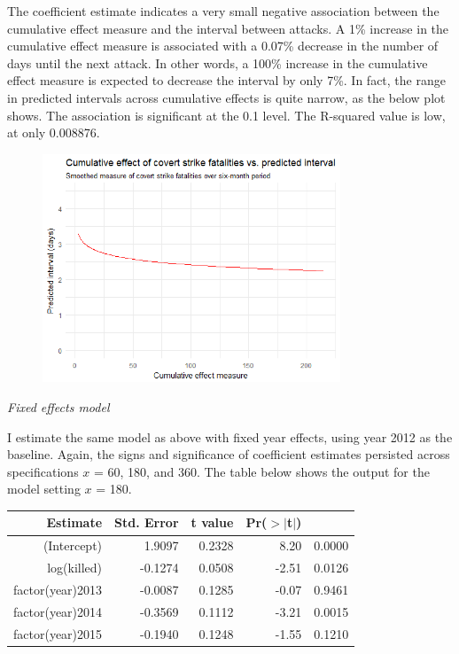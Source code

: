 \documentclass[letterpaper,12pt]{article}
\theoremstyle{definition}
\begin{document}
The coefficient estimate indicates a very small negative association between the cumulative effect measure and the interval between attacks. A 1\% increase in the cumulative effect measure is associated with a 0.07\% decrease in the number of days until the next attack. In other words, a 100\% increase in the cumulative effect measure is expected to decrease the interval by only 7\%. In fact, the range in predicted intervals across cumulative effects is quite narrow, as the below plot shows. The association is significant at the 0.1 level. The R-squared value is low, at only 0.008876. \\

\begin{figure}[ht!]
  \includegraphics[width=3.5in]{pred_plot.png}
\end{figure}

\noindent\textit{Fixed effects model}

I estimate the same model as above with fixed year effects, using year 2012 as the baseline. Again, the signs and significance of coefficient estimates persisted across specifications  $x$ = 60, 180, and 360. The table below shows the output for the model setting $x$ = 180.

\begin{table}[htb!]
\centering
\begin{tabular}{rrrrr}
  \hline
Estimate & Std. Error & t value & Pr($>$$|$t$|$) \\ 
  \hline
(Intercept) & 1.9097 & 0.2328 & 8.20 & 0.0000 \\ 
  log(killed) & -0.1274 & 0.0508 & -2.51 & 0.0126 \\ 
  factor(year)2013 & -0.0087 & 0.1285 & -0.07 & 0.9461 \\ 
  factor(year)2014 & -0.3569 & 0.1112 & -3.21 & 0.0015 \\ 
  factor(year)2015 & -0.1940 & 0.1248 & -1.55 & 0.1210 \\ 
   \hline
\end{tabular}
\end{table}
\end{document}

